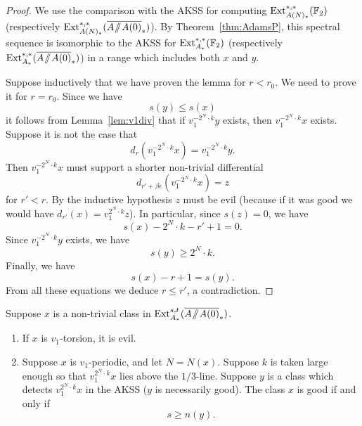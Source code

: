 \begin{proof}
We use the comparison with the AKSS for computing $\operatorname{Ext}^{*,*}_{A(N)_*}(\mathbb{F}_2)$ (respectively $\Ext^{*,*}_{A(N)_*}(\AA0)$). By Theorem~\ref{thm:AdamsP}, this spectral sequence is isomorphic to the AKSS for $\operatorname{Ext}^{*,*}_{A_*}(\mathbb{F}_2)$ (respectively $\Ext^{*,*}_{A_*}(\AA0)$) in a range which includes both $x$ and $y$. 



Suppose inductively that we have proven the lemma for $r < r_0$.  We need to prove it for $r = r_0$.  Since we have
$$ s(y) \le s(x) $$
it follows from Lemma~\ref{lem:v1div} that if $v_1^{-2^N\cdot k} y$ exists, then $v_1^{-2^N\cdot k} x$ exists.  Suppose it is not the case that  
$$ d_r(v_1^{-2^N\cdot k} x) = v_1^{-2^N\cdot k} y. $$
Then $v_1^{-2^N\cdot k} x$ must support a shorter non-trivial differential
$$   d_{r'+\beta\epsilon}(v_1^{-2^N\cdot k} x) = z $$
for $r' < r$.  By the inductive hypothesis $z$ must be evil (because if it was good we would have $d_{r'}(x) = v_1^{2^N\cdot k} z$).  In particular, since $s(z) = 0$, we have
$$ s(x)-2^{N}\cdot k-r'+1 = 0. $$
Since $v_1^{-2^N\cdot k} y$ exists, we have
$$ s(y) \ge 2^N\cdot k. $$
Finally, we have
$$ s(x) - r+1 = s(y). $$
From all these equations we deduce $r \le r'$, a contradiction.
\end{proof}


\begin{thm}\label{thm:dichotomyAA0}
Suppose $x$ is a non-trivial class in $\Ext^{s,t}_{A_*}(\AA0)$.
\begin{enumerate}
\item
If $x$ is $v_1$-torsion, it is evil.

\item 
Suppose $x$ is $v_1$-periodic, and let $N = N(x)$.  Suppose $k$ is taken large enough so that  $v_1^{2^N\cdot k} x$ lies above the $1/3$-line.  Suppose $y$ is a class
which detects $v_1^{2^N\cdot k} x$ in the AKSS ($y$ is necessarily good).  The class $x$ is good if and only if 
\[ s \ge n(y). \]
\end{enumerate}
\end{thm}

